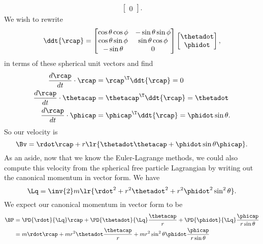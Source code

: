 {\begin{equation}
\begin{aligned}
\begin{bmatrix}
0
\end{bmatrix} .
\end{aligned}
\end{equation}
%
We wish to rewrite
%
\begin{equation}\label{eqn:classicalMechanicsPs2:230}
\ddt{\rcap} =
\begin{bmatrix}
\cos\theta \cos\phi & - \sin\theta \sin\phi \\
\cos\theta \sin\phi & \sin\theta \cos\phi \\
-\sin\theta & 0
\end{bmatrix}
\begin{bmatrix}
\thetadot \\
\phidot
\end{bmatrix},
\end{equation}
%
in terms of these spherical unit vectors and find
%
\begin{equation}\label{eqn:classicalMechanicsPs2:250}
\begin{aligned}
\frac{d\rcap}{dt} \cdot \rcap &= \rcap^\T \ddt{\rcap} = 0  \\
\frac{d\rcap}{dt} \cdot \thetacap &= \thetacap^\T \ddt{\rcap} = \thetadot \\
\frac{d\rcap}{dt} \cdot \phicap &= \phicap^\T \ddt{\rcap} = \phidot \sin\theta.
\end{aligned}
\end{equation}
%
So our velocity is
%
\begin{equation}\label{eqn:classicalMechanicsPs2:270}
\Bv = \rdot \rcap + r
\lr{ \thetadot \thetacap + \phidot \sin\theta \phicap }.
\end{equation}
%
As an aside, now that we know the Euler-Lagrange methods, we could also compute this velocity from the spherical free particle Lagrangian by writing out the canonical momentum in vector form.  We have
%
\begin{equation}\label{eqn:classicalMechanicsPs2:290}
\Lq = \inv{2} m
\lr{  \rdot^2 + r^2 \thetadot^2 + r^2 \phidot^2 \sin^2 \theta }.
\end{equation}
%
We expect our canonical momentum in vector form to be
%
\begin{equation}\label{eqn:classicalMechanicsPs2:1050}
\begin{aligned}
\BP &=
\PD{\rdot}{\Lq} \rcap
+\PD{\thetadot}{\Lq} \frac{\thetacap}{r}
+\PD{\phidot}{\Lq} \frac{\phicap}{r \sin\theta} \\
&=
m \rdot \rcap
+ m r^2 \thetadot \frac{\thetacap}{r}
+ m r^2 \sin^2\theta \phidot \frac{\phicap}{r \sin\theta} \\

\end{aligned}
\end{equation}}

